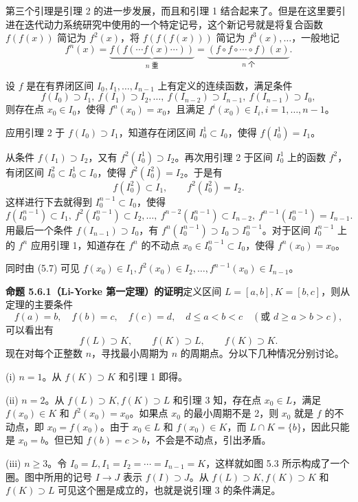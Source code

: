 第三个引理是引理 2 的进一步发展，而且和引理 1 结合起来了。但是在这里要引进在迭代动力系统研究中使用的一个特定记号，这个新记号就是将复合函数 $f(f(x))$ 简记为 $f^2(x)$，将 $f(f(f(x)))$ 简记为 $f^3(x),\ldots$，一般地记
\begin{equation}
  f^n(x)=\underbrace{f(f(\cdots f(x)\cdots))}_{n\text{ 重}}=\underbrace{(f\circ f\circ\cdots\circ f)(x)}_{n\text{ 个}}.
  \tag{5.6}
  \label{eq:5.6}
\end{equation}

\begin{xexample}[5.6.3（引理 3）]
设 $f$ 是在有界闭区间 $I_0,I_1,\ldots,I_{n-1}$ 上有定义的连续函数，满足条件
\[
  f(I_0)\supset I_1,\ f(I_1)\supset I_2,\ldots,\ f(I_{n-2})\supset I_{n-1},\ f(I_{n-1})\supset I_0,
\]
则存在点 $x_0\in I_0$，使得 $f^n(x_0)=x_0$，且满足 $f^i(x_0)\in I_i,i=1,\ldots,n-1$。
\end{xexample}
\begin{xproof}
应用引理 2 于 $f(I_0)\supset I_1$，知道存在闭区间 $I_0^1\subset I_0$，使得 $f(I_0^1)=I_1$。

从条件 $f(I_1)\supset I_2$，又有 $f^2(I_0^1)\supset I_2$。再次用引理 2 于区间 $I_0^1$ 上的函数 $f^2$，有闭区间 $I_0^2\subset I_0^1\subset I_0$，使得 $f^2(I_0^2)=I_2$。于是有
\[
  f(I_0^2)\subset I_1,\qquad f^2(I_0^2)=I_2.
\]
这样进行下去就得到 $I_0^{n-1}\subset I_0$，使得
\begin{equation}
  f(I_0^{n-1})\subset I_1,\ f^2(I_0^{n-1})\subset I_2,\ldots,\ f^{n-2}(I_0^{n-1})\subset I_{n-2},\ f^{n-1}(I_0^{n-1})=I_{n-1}.
  \tag{5.7}
  \label{eq:5.7}
\end{equation}
用最后一个条件 $f(I_{n-1})\supset I_0$，有 $f^n(I_0^{n-1})\supset I_0\supset I_0^{n-1}$。对于区间 $I_0^{n-1}$ 上的 $f^n$ 应用引理 1，知道存在 $f^n$ 的不动点 $x_0\in I_0^{n-1}\subset I_0$，使得 $f^n(x_0)=x_0$。

同时由 (5.7) 可见 $f(x_0)\in I_1,f^2(x_0)\in I_2,\ldots,f^{n-1}(x_0)\in I_{n-1}$。
\end{xproof}

\begin{xproof}
\textbf{命题 5.6.1（Li-Yorke 第一定理）的证明}\quad 定义区间 $L=[a,b],K=[b,c]$，则从定理的主要条件
\[
  f(a)=b,\quad f(b)=c,\quad f(c)=d,\quad d\le a<b<c\quad(\text{或 }d\ge a>b>c),
\]
可以看出有
\[
  f(L)\supset K,\qquad f(K)\supset L,\qquad f(K)\supset K.
\]
现在对每个正整数 $n$，寻找最小周期为 $n$ 的周期点。分以下几种情况分别讨论。

(i) $n=1$。从 $f(K)\supset K$ 和引理 1 即得。

(ii) $n=2$。从 $f(L)\supset K,f(K)\supset L$ 和引理 3 知，存在点 $x_0\in L$，满足 $f(x_0)\in K$ 和 $f^2(x_0)=x_0$。如果点 $x_0$ 的最小周期不是 2，则 $x_0$ 就是 $f$ 的不动点，即 $x_0=f(x_0)$。由于 $x_0\in L$ 和 $f(x_0)\in K$，而 $L\cap K=\{b\}$，因此只能是 $x_0=b$。但已知 $f(b)=c>b$，不会是不动点，引出矛盾。

(iii) $n\ge3$。令 $I_0=L,I_1=I_2=\cdots=I_{n-1}=K$，这样就如图 5.3 所示构成了一个圈。图中所用的记号 $I\longrightarrow J$ 表示 $f(I)\supset J$。从 $f(L)\supset K,f(K)\supset K$ 和 $f(K)\supset L$ 可见这个圈是成立的，也就是说引理 3 的条件满足。
\end{xproof}

